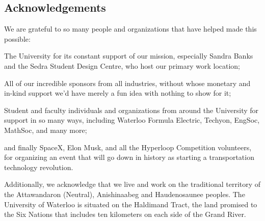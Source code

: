 \documentclass[main.tex]{subfiles}
\begin{document}
\subsection{Acknowledgements}

We are grateful to so many people and organizations that have helped made this possible:

The University for its constant support of our mission, especially Sandra Banks and the Sedra Student Design Centre, who host our primary work location;

All of our incredible sponsors from all industries, without whose monetary and in-kind support we'd have merely a fun idea with nothing to show for it;

Student and faculty individuals and organizations from around the University for support in so many ways, including Waterloo Formula Electric, Techyon, EngSoc, MathSoc, and many more;

and finally SpaceX, Elon Musk, and all the Hyperloop Competition volunteers, for organizing an event that will go down in history as starting a transportation technology revolution.

Additionally, we acknowledge that we live and work on the traditional territory of the Attawandaron (Neutral), Anishinaabeg and Haudenosaunee peoples. The University of Waterloo is situated on the Haldimand Tract, the land promised to the Six Nations that includes ten kilometers on each side of the Grand River.
\newpage
\end{document}

